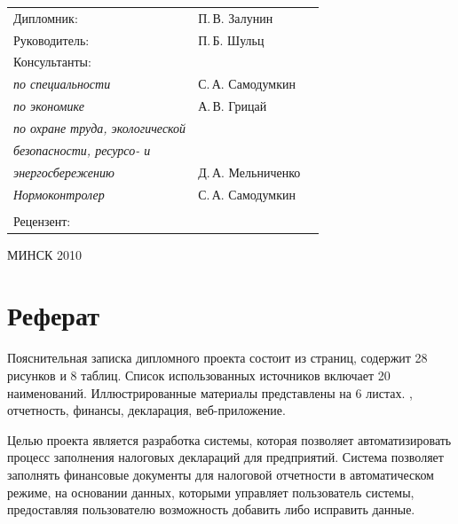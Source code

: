 \documentclass[14pt,a4paper]{reportmod}
\begin{document}
\begin{titlepage}
\begin{tabular}{p{9.5cm}p{4.5cm}r}
 Дипломник: &  П.\,В. Залунин & \\
 Руководитель: &  П.\,Б. Шульц & \\
 Консультанты: & &\\
 \hspace{1cm} \textit{по специальности} &  С.\,А. Самодумкин & \\
 \hspace{1cm} \textit{по экономике} &  А.\,В. Грицай & \\
 \hspace{1cm} \textit{по охране труда, экологической} & &\\
 \hspace{1cm} \textit{безопасности, ресурсо- и} & &\\
 \hspace{1cm} \textit{энергосбережению} &  Д.\,А. Мельниченко & \\
 \hspace{1cm} \textit{Нормоконтролер} &  С.\,А. Самодумкин & \\
 & &\\
 Рецензент: &  & \\
\end{tabular}
\vspace{0.8cm}

\begin{center}
МИНСК 2010%
\end{center}

\end{titlepage}

\linespread{1.05}
\setcounter{page}{4}
\thispagestyle{empty}

\chapter*{Реферат}
\thispagestyle{empty}
Пояснительная записка дипломного проекта состоит из \pageref{LastPage} страниц, содержит 28 рисунков и 8 таблиц. Список использованных источников включает 20 наименований. Иллюстрированные материалы представлены на 6 листах.
\newline
{}, отчетность, финансы, декларация, веб-приложение.
\newline

Целью проекта является разработка системы, которая позволяет автоматизировать процесс заполнения налоговых деклараций для предприятий. Система позволяет заполнять финансовые документы для налоговой отчетности в автоматическом режиме, на основании данных, которыми управляет пользователь системы, предоставляя пользователю возможность добавить либо исправить данные.
\end{document}
